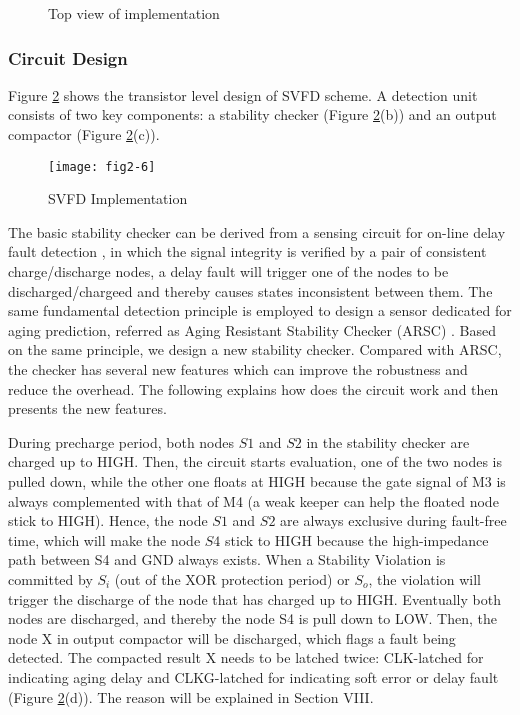 \begin{figure}[t]
\centering 
{} 
  \caption{Top view of implementation}
\label{imple}
\end{figure}
\subsubsection{Circuit Design}
Figure \ref{circuit} shows the transistor level design of SVFD scheme. A detection unit consists of two key components: a stability checker (Figure \ref{circuit}(b)) and an output compactor (Figure \ref{circuit}(c)).

\begin{figure}[t]
\centering
\texttt{[image: fig2-6]}
\vspace{-0.5em}  
\caption{SVFD Implementation} \label{circuit}
\end{figure}

The basic stability checker can be derived from a sensing circuit for on-line delay fault detection \cite{favalli1996sensing}, in which the signal integrity is verified by a pair of consistent charge/discharge nodes, a delay fault will trigger one of the nodes to be discharged/chargeed and thereby causes states inconsistent between them. The same fundamental detection principle is employed to design a sensor dedicated for aging prediction, referred as Aging Resistant Stability Checker (ARSC) \cite{agarwal2007circuit}. Based on the same principle, we design a new stability checker. Compared with ARSC, the checker has several new features which can improve the robustness and reduce the overhead. The following explains how does the circuit work and then presents the new features.

During precharge period, both nodes $S1$ and $S2$ in the stability checker are charged up to HIGH. Then, the circuit starts evaluation, one of the two nodes is pulled down, while the other one floats at HIGH because the gate signal of M3 is always complemented with that of M4 (a weak keeper can help the floated node stick to HIGH). Hence, the node $S1$ and $S2$ are always exclusive during fault-free time, which will make the node $S4$ stick to HIGH because the high-impedance path between S4 and GND always exists. When a Stability Violation is committed by $S_i$ (out of the XOR protection period) or $S_o$, the violation will trigger the discharge of the node that has charged up to HIGH. Eventually both nodes are discharged, and thereby the node S4 is pull down to LOW. Then, the node X in output compactor will be discharged, which flags a fault being detected. The compacted result X needs to be latched twice: CLK-latched for indicating aging delay and CLKG-latched for indicating soft error or delay fault (Figure \ref{circuit}(d)). The reason will be explained in Section VIII.

